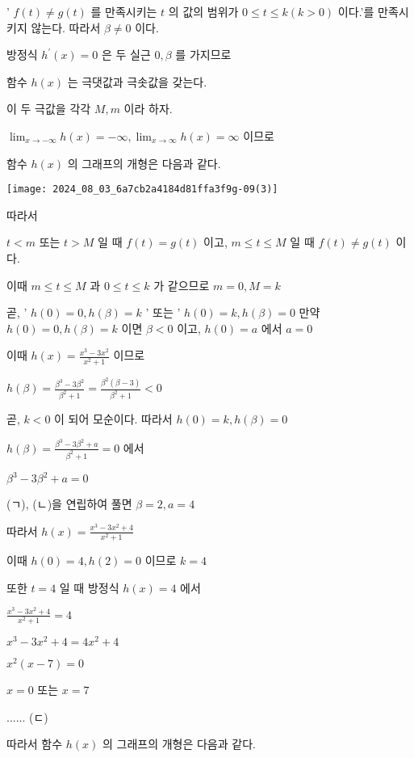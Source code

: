 \documentclass[10pt]{article}
\begin{document}
' \(f(t) \neq g(t)\) 를 만족시키는 \(t\) 의 값의 범위가 \(0 \leq t \leq k(k>0)\) 이다.'를 만족시키지 않는다. 따라서 \(\beta \neq 0\) 이다.

방정식 \(h^{\prime}(x)=0\) 은 두 실근 \(0, \beta\) 를 가지므로

함수 \(h(x)\) 는 극댓값과 극솟값을 갖는다.

이 두 극값을 각각 \(M, m\) 이라 하자.

\(\lim _{x \rightarrow-\infty} h(x)=-\infty, \lim _{x \rightarrow \infty} h(x)=\infty\) 이므로

함수 \(h(x)\) 의 그래프의 개형은 다음과 같다.

\begin{center}
\texttt{[image: 2024\_08\_03\_6a7cb2a4184d81ffa3f9g-09(3)]}
\end{center}

따라서

\(t<m\) 또는 \(t>M\) 일 때 \(f(t)=g(t)\) 이고, \(m \leq t \leq M\) 일 때 \(f(t) \neq g(t)\) 이다.

이때 \(m \leq t \leq M\) 과 \(0 \leq t \leq k\) 가 같으므로 \(m=0, M=k\)

곧, ' \(h(0)=0, h(\beta)=k\) ' 또는 ' \(h(0)=k, h(\beta)=0\) 만약 \(h(0)=0, h(\beta)=k\) 이면 \(\beta<0\) 이고, \(h(0)=a\) 에서 \(a=0\)

이때 \(h(x)=\frac{x^{3}-3 x^{2}}{x^{2}+1}\) 이므로

\(h(\beta)=\frac{\beta^{3}-3 \beta^{2}}{\beta^{2}+1}=\frac{\beta^{2}(\beta-3)}{\beta^{2}+1}<0\)

곧, \(k<0\) 이 되어 모순이다. 따라서 \(h(0)=k, h(\beta)=0\)

\(h(\beta)=\frac{\beta^{3}-3 \beta^{2}+a}{\beta^{2}+1}=0\) 에서

\(\beta^{3}-3 \beta^{2}+a=0\)

(ㄱ), (ㄴ)을 연립하여 풀면 \(\beta=2, a=4\)

따라서 \(h(x)=\frac{x^{3}-3 x^{2}+4}{x^{2}+1}\)

이때 \(h(0)=4, h(2)=0\) 이므로 \(k=4\)

또한 \(t=4\) 일 때 방정식 \(h(x)=4\) 에서

\(\frac{x^{3}-3 x^{2}+4}{x^{2}+1}=4\)

\(x^{3}-3 x^{2}+4=4 x^{2}+4\)

\(x^{2}(x-7)=0\)

\(x=0\) 또는 \(x=7\)

...... (ㄷ)

따라서 함수 \(h(x)\) 의 그래프의 개형은 다음과 같다.
\end{document}
